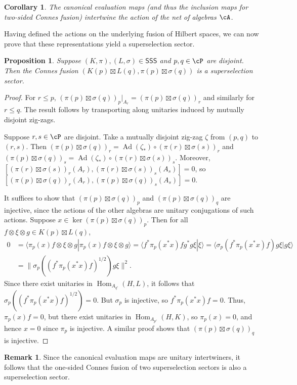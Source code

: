 \documentclass[11pt,reqno]{amsart}
\DeclareMathOperator{\Ad}{Ad}
\DeclareMathOperator{\Hom}{Hom}
\newcommand{\SSS}{\mathsf{SSS}}
\numberwithin{equation}{section}
\theoremstyle{plain}
\newtheorem{corollary}[equation]{Corollary}
\newtheorem{proposition}[equation]{Proposition}
\theoremstyle{definition}
\newtheorem{remark}[equation]{Remark}
\begin{document}
\begin{corollary}
    The canonical evaluation maps (and thus the inclusion maps for two-sided Connes fusion) intertwine the action of the net of algebras $\cA$.
\end{corollary}

Having defined the actions on the underlying fusion of Hilbert spaces, we can now prove that these representations yield a superselection sector.

\begin{proposition}
    Suppose $(K,\pi),(L,\sigma)\in\SSS$ and $p,q\in {\cP}$ are disjoint. Then the Connes fusion $(K(p)\boxtimes L(q),\pi(p)\boxtimes \sigma(q))$ is a superselection sector.
\end{proposition}

\begin{proof}
    \item[\underline{Isotony:}] For $r\leq p$, $(\pi(p)\boxtimes\sigma(q))_p|_{A_r}=(\pi(p)\boxtimes\sigma(q))_r$ and similarly for $r\leq q$. The result follows by transporting along unitaries induced by mutually disjoint zig-zags.
    
    \item[\underline{Locality:}] Suppose $r,s\in{\cP}$ are disjoint. Take a mutually disjoint zig-zag $\zeta$ from $(p,q)$ to $(r,s)$. Then $(\pi(p)\boxtimes\sigma(q))_r=\Ad(\zeta_*)\circ (\pi(r)\boxtimes\sigma(s))_r$ and $(\pi(p)\boxtimes\sigma(q))_s=\Ad(\zeta_*)\circ (\pi(r)\boxtimes\sigma(s))_s$. Moreover, $[(\pi(r)\boxtimes\sigma(s))_r(A_r),(\pi(r)\boxtimes\sigma(s))_s(A_s)]=0$, so $[(\pi(p)\boxtimes\sigma(q))_r(A_r),(\pi(p)\boxtimes\sigma(q))_s(A_s)]=0$.
    
    \item[\underline{Absorbing:}] It suffices to show that $(\pi(p)\boxtimes\sigma(q))_p$ and $(\pi(p)\boxtimes\sigma(q))_q$ are injective, since the actions of the other algebras are unitary conjugations of such actions. Suppose $x\in \ker (\pi(p)\boxtimes\sigma(q))_p$. Then for all $f\otimes\xi\otimes g\in K(p)\boxtimes L(q)$,
    \begin{align*}
        0&=\langle \pi_p(x)f\otimes\xi\otimes g|\pi_p(x)f\otimes\xi\otimes g\rangle
        =\langle f^* \pi_p(x^*x)fg^*g\xi|\xi\rangle
        =\langle\sigma_p(f^* \pi_p(x^*x)f)g\xi|g\xi\rangle \\
        &=\lVert\sigma_p((f^* \pi_p(x^*x)f)^{1/2})g\xi\rVert^2.
    \end{align*}
    Since there exist unitaries in $\Hom_{A_{q'}}(H,L)$, it follows that $\sigma_p((f^* \pi_p(x^*x)f)^{1/2})=0$. But $\sigma_p$ is injective, so $f^* \pi_p(x^*x)f=0$. Thus, $\pi_p(x)f=0$, but there exist unitaries in $\Hom_{A_{p'}}(H,K)$, so $\pi_p(x)=0$, and hence $x=0$ since $\pi_p$ is injective. A similar proof shows that $(\pi(p)\boxtimes\sigma(q))_q$ is injective.
\end{proof}
\begin{remark}
Since the canonical evaluation maps are unitary intertwiners, it follows that the one-sided Connes fusion of two superselection sectors is also a superselection sector.
\end{remark}
\end{document}
